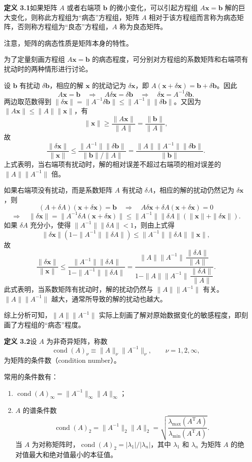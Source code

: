 \textbf{定义 3.1}\quad 如果矩阵 $A$ 或者右端项 $\bm b$ 的微小变化，可以引起方程组 $A\bm x=\bm b$ 解的巨大变化，则称此方程组为“病态”方程组，矩阵 $A$ 相对于该方程组而言称为病态矩阵，否则称方程组为“良态”方程组，$A$ 称为良态矩阵。

注意，矩阵的病态性质是矩阵本身的特性。

为了定量刻画方程组 $A\bm x=\bm b$ 的病态程度，可分别对方程组的系数矩阵和右端项有扰动时的两种情形进行讨论。

设 $\bm b$ 有扰动 $\delta\bm b$，相应的解 $\bm x$ 的扰动记为 $\delta\bm x$，即 $A(\bm x+\delta\bm x)=\bm b+\delta\bm b$。因此
\[
A\bm x=\bm b\quad\Rightarrow\quad A\delta\bm x=\delta\bm b
\quad\Rightarrow\quad \delta\bm x=A^{-1}\delta\bm b.
\]
两边取范数得到 $\|\delta\bm x\|=\|A^{-1}\delta\bm b\|\le\|A^{-1}\|\|\delta\bm b\|$。又因为 $\|A\bm x\|\le\|A\|\|\bm x\|$，有
\[
\|\bm x\|\ge\frac{\|A\bm x\|}{\|A\|}=\frac{\|\bm b\|}{\|A\|},
\]
故
\[
\frac{\|\delta\bm x\|}{\|\bm x\|}
\le
\frac{\|A^{-1}\|\|\delta\bm b\|}{\|\bm b\|/\|A\|}
=
\frac{\|A\|\|A^{-1}\|\|\delta\bm b\|}{\|\bm b\|}.
\]
上式表明，当右端项有扰动时，解的相对误差不超过右端项的相对误差的 $\|A\|\|A^{-1}\|$ 倍。

如果右端项没有扰动，而是系数矩阵 $A$ 有扰动 $\delta A$，相应的解的扰动仍然记为 $\delta\bm x$，则
\[
(A+\delta A)(\bm x+\delta\bm x)=\bm b
\quad\Rightarrow\quad
A\delta\bm x+\delta A(\bm x+\delta\bm x)=0
\]
\[
\Rightarrow\quad
\|\delta\bm x\|=\|A^{-1}\delta A(\bm x+\delta\bm x)\|
\le\|A^{-1}\|\|\delta A\|(\|\bm x\|+\|\delta\bm x\|).
\]
如果 $\delta A$ 充分小，使得 $\|A^{-1}\|\|\delta A\|<1$，则由上式得
\[
\|\delta\bm x\|\left(1-\|A^{-1}\|\|\delta A\|\right)
\le\|A^{-1}\|\|\delta A\|\|\bm x\|,
\]
故
\[
\frac{\|\delta\bm x\|}{\|\bm x\|}
\le
\frac{\|A^{-1}\|\|\delta A\|}{1-\|A^{-1}\|\|\delta A\|}
=
\frac{\|A\|\|A^{-1}\|\,\dfrac{\|\delta A\|}{\|A\|}}
{1-\|A\|\|A^{-1}\|\,\dfrac{\|\delta A\|}{\|A\|}}.
\]
此式表明，当系数矩阵有扰动时，解的扰动仍然与 $\|A\|\|A^{-1}\|$ 有关。$\|A\|\|A^{-1}\|$ 越大，通常所导致的解的扰动也越大。

综上分析可知，$\|A\|\|A^{-1}\|$ 实际上刻画了解对原始数据变化的敏感程度，即刻画了方程组的“病态”程度。

\textbf{定义 3.2}\quad 设 $A$ 为非奇异矩阵，称数
\[
\operatorname{cond}(A)_\nu\equiv\|A\|_\nu\|A^{-1}\|_\nu,\qquad \nu=1,2,\infty,
\]
为矩阵的条件数（condition number）。

常用的条件数有：
\begin{enumerate}
\item $\operatorname{cond}(A)_\infty=\|A^{-1}\|_\infty\|A\|_\infty$；
\item $A$ 的谱条件数
\[
\operatorname{cond}(A)_2=\|A^{-1}\|_2\|A\|_2
=\sqrt{\frac{\lambda_{\max}(A^{\mathrm T}A)}{\lambda_{\min}(A^{\mathrm T}A)}}.
\]
当 $A$ 为对称矩阵时，$\operatorname{cond}(A)_2=|\lambda_1|/|\lambda_n|$，其中 $\lambda_1$ 和 $\lambda_n$ 为矩阵 $A$ 的绝对值最大和绝对值最小的本征值。
\end{enumerate}

